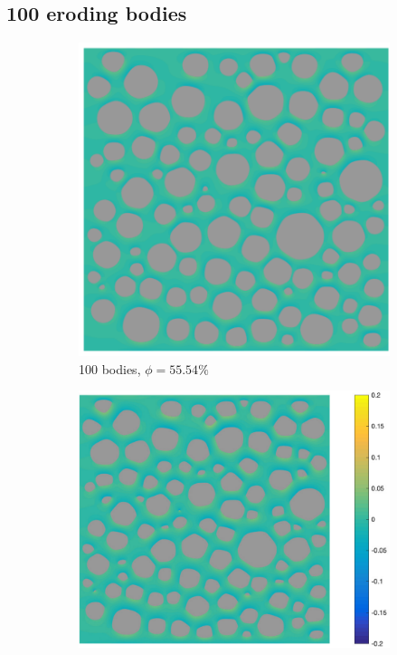 \documentclass{jfm}
\begin{document}
\subsection{100 eroding bodies}
\label{sec:Eroding100}
\begin{figure}
\begin{subfigure}[b]{0.5\textwidth}
\includegraphics*[height =0.8\linewidth]{./figs/100b_50}
\caption{100 bodies, $\phi = 55.54\%$}
\end{subfigure}%
\begin{subfigure}[b]{0.5\textwidth}
\includegraphics*[height =0.8\linewidth]{./figs/100b_100}

\end{subfigure}
\end{figure}
\end{document}
